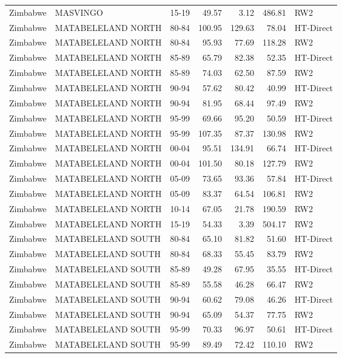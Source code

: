 \begin{longtable}{lllrrrl}
  Zimbabwe & MASVINGO & 15-19 & 49.57 & 3.12 & 486.81 & RW2 \\ 
  Zimbabwe & MATABELELAND NORTH & 80-84 & 100.95 & 129.63 & 78.04 & HT-Direct \\ 
  Zimbabwe & MATABELELAND NORTH & 80-84 & 95.93 & 77.69 & 118.28 & RW2 \\ 
  Zimbabwe & MATABELELAND NORTH & 85-89 & 65.79 & 82.38 & 52.35 & HT-Direct \\ 
  Zimbabwe & MATABELELAND NORTH & 85-89 & 74.03 & 62.50 & 87.59 & RW2 \\ 
  Zimbabwe & MATABELELAND NORTH & 90-94 & 57.62 & 80.42 & 40.99 & HT-Direct \\ 
  Zimbabwe & MATABELELAND NORTH & 90-94 & 81.95 & 68.44 & 97.49 & RW2 \\ 
  Zimbabwe & MATABELELAND NORTH & 95-99 & 69.66 & 95.20 & 50.59 & HT-Direct \\ 
  Zimbabwe & MATABELELAND NORTH & 95-99 & 107.35 & 87.37 & 130.98 & RW2 \\ 
  Zimbabwe & MATABELELAND NORTH & 00-04 & 95.51 & 134.91 & 66.74 & HT-Direct \\ 
  Zimbabwe & MATABELELAND NORTH & 00-04 & 101.50 & 80.18 & 127.79 & RW2 \\ 
  Zimbabwe & MATABELELAND NORTH & 05-09 & 73.65 & 93.36 & 57.84 & HT-Direct \\ 
  Zimbabwe & MATABELELAND NORTH & 05-09 & 83.37 & 64.54 & 106.81 & RW2 \\ 
  Zimbabwe & MATABELELAND NORTH & 10-14 & 67.05 & 21.78 & 190.59 & RW2 \\ 
  Zimbabwe & MATABELELAND NORTH & 15-19 & 54.33 & 3.39 & 504.17 & RW2 \\ 
  Zimbabwe & MATABELELAND SOUTH & 80-84 & 65.10 & 81.82 & 51.60 & HT-Direct \\ 
  Zimbabwe & MATABELELAND SOUTH & 80-84 & 68.33 & 55.45 & 83.79 & RW2 \\ 
  Zimbabwe & MATABELELAND SOUTH & 85-89 & 49.28 & 67.95 & 35.55 & HT-Direct \\ 
  Zimbabwe & MATABELELAND SOUTH & 85-89 & 55.58 & 46.28 & 66.47 & RW2 \\ 
  Zimbabwe & MATABELELAND SOUTH & 90-94 & 60.62 & 79.08 & 46.26 & HT-Direct \\ 
  Zimbabwe & MATABELELAND SOUTH & 90-94 & 65.09 & 54.37 & 77.75 & RW2 \\ 
  Zimbabwe & MATABELELAND SOUTH & 95-99 & 70.33 & 96.97 & 50.61 & HT-Direct \\ 
  Zimbabwe & MATABELELAND SOUTH & 95-99 & 89.49 & 72.42 & 110.10 & RW2 \\ 

\end{longtable}
